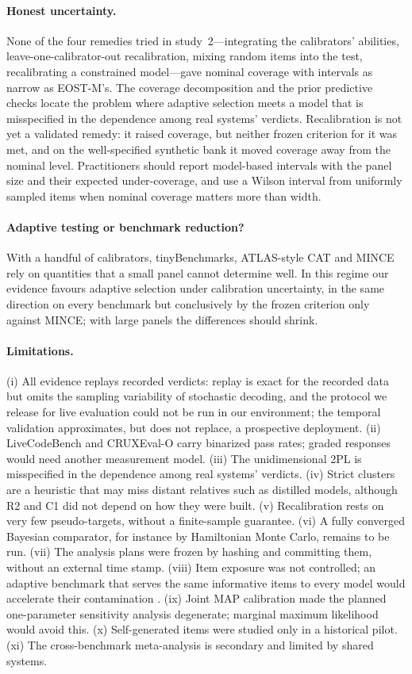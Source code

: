 \paragraph{Honest uncertainty.} None of the four remedies tried in study~2---integrating
the calibrators' abilities, leave-one-calibrator-out recalibration, mixing random items into
the test, recalibrating a constrained model---gave nominal coverage with intervals as narrow as
EOST-M's. The coverage decomposition and the prior predictive checks locate the problem where
adaptive selection meets a model that is misspecified in the dependence among real systems'
verdicts. Recalibration is not yet a validated remedy: it raised coverage, but neither frozen
criterion for it was met, and on the well-specified synthetic bank it moved coverage away
from the nominal level. Practitioners should report model-based intervals with the panel size
and their expected under-coverage, and use a Wilson interval from uniformly sampled items when
nominal coverage matters more than width.

\paragraph{Adaptive testing or benchmark reduction?} With a handful of calibrators,
tinyBenchmarks, ATLAS-style CAT and MINCE rely on quantities that a small panel cannot
determine well. In this regime our evidence favours adaptive selection under calibration
uncertainty, in the same direction on every benchmark but conclusively by the frozen
criterion only against MINCE; with large panels the differences should shrink.

\paragraph{Limitations.} (i) All evidence replays recorded verdicts: replay is exact for the
recorded data but omits the sampling variability of stochastic decoding, and the protocol we
release for live evaluation could not be run in our environment; the temporal validation
approximates, but does not replace, a prospective deployment. (ii) LiveCodeBench and
CRUXEval-O carry binarized pass rates; graded responses would need another measurement model.
(iii) The unidimensional 2PL is misspecified in the dependence among real systems' verdicts.
(iv) Strict clusters are a heuristic that may miss distant relatives such as distilled models,
although R2 and C1 did not depend on how they were built. (v) Recalibration rests on very
few pseudo-targets, without a finite-sample guarantee. (vi) A fully converged Bayesian
comparator, for instance by Hamiltonian Monte Carlo, remains to be run. (vii) The analysis
plans were frozen by hashing and committing them, without an external time stamp. (viii) Item
exposure was not controlled; an adaptive benchmark that serves the same informative items to
every model would accelerate their contamination \citep{wainer2000cat}. (ix) Joint MAP
calibration made the planned one-parameter sensitivity analysis degenerate; marginal maximum
likelihood would avoid this. (x) Self-generated items were studied only in a historical
pilot. (xi) The cross-benchmark meta-analysis is secondary and limited by shared systems.

